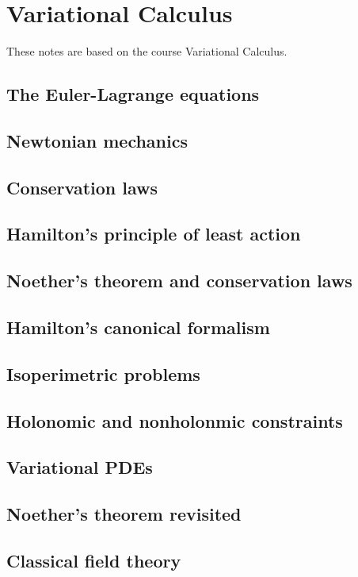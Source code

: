 \chapter{Variational Calculus}\label{cha:variational-calculus}
These notes are based on the course Variational Calculus.

\section{The Euler-Lagrange equations}

\section{Newtonian mechanics}

\section{Conservation laws}

\section{Hamilton's principle of least action}

\section{Noether's theorem and conservation laws}

\section{Hamilton's canonical formalism}

\section{Isoperimetric problems}

\section{Holonomic and nonholonmic constraints}

\section{Variational PDEs}

\section{Noether's theorem revisited}

\section{Classical field theory}


